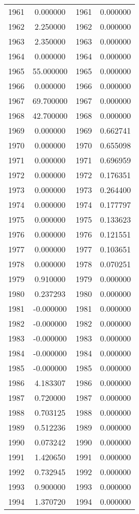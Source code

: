 \documentclass[12pt]{article}
\begin{document}
\begin{longtable}{@{}cccc@{}}
1961 & 0.000000 & 1961 & 0.000000 \\
1962 & 2.250000 & 1962 & 0.000000 \\
1963 & 2.350000 & 1963 & 0.000000 \\
1964 & 0.000000 & 1964 & 0.000000 \\
1965 & 55.000000 & 1965 & 0.000000 \\
1966 & 0.000000 & 1966 & 0.000000 \\
1967 & 69.700000 & 1967 & 0.000000 \\
1968 & 42.700000 & 1968 & 0.000000 \\
1969 & 0.000000 & 1969 & 0.662741 \\
1970 & 0.000000 & 1970 & 0.655098 \\
1971 & 0.000000 & 1971 & 0.696959 \\
1972 & 0.000000 & 1972 & 0.176351 \\
1973 & 0.000000 & 1973 & 0.264400 \\
1974 & 0.000000 & 1974 & 0.177797 \\
1975 & 0.000000 & 1975 & 0.133623 \\
1976 & 0.000000 & 1976 & 0.121551 \\
1977 & 0.000000 & 1977 & 0.103651 \\
1978 & 0.000000 & 1978 & 0.070251 \\
1979 & 0.910000 & 1979 & 0.000000 \\
1980 & 0.237293 & 1980 & 0.000000 \\
1981 & -0.000000 & 1981 & 0.000000 \\
1982 & -0.000000 & 1982 & 0.000000 \\
1983 & -0.000000 & 1983 & 0.000000 \\
1984 & -0.000000 & 1984 & 0.000000 \\
1985 & -0.000000 & 1985 & 0.000000 \\
1986 & 4.183307 & 1986 & 0.000000 \\
1987 & 0.720000 & 1987 & 0.000000 \\
1988 & 0.703125 & 1988 & 0.000000 \\
1989 & 0.512236 & 1989 & 0.000000 \\
1990 & 0.073242 & 1990 & 0.000000 \\
1991 & 1.420650 & 1991 & 0.000000 \\
1992 & 0.732945 & 1992 & 0.000000 \\
1993 & 0.900000 & 1993 & 0.000000 \\
1994 & 1.370720 & 1994 & 0.000000 \\

\end{longtable}
\end{document}
